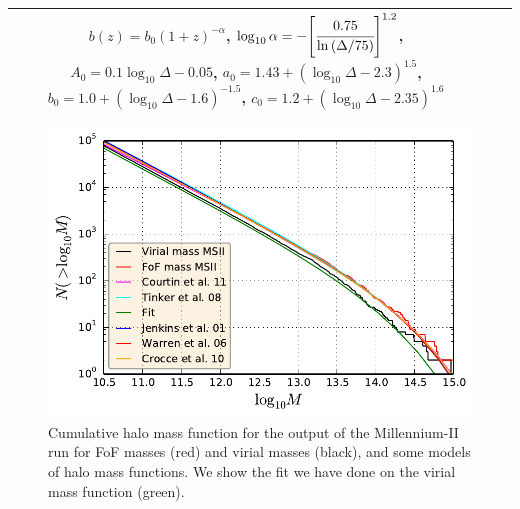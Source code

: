 \begin{table}
\begin{tabular}{cp{6.5cm}p{5cm}}
        $b\left(z\right)=b_0{\left(1+z\right)}^{-\alpha}$,\newline
        $\log_{10}\alpha=
        -{\left[\cfrac{0.75}{\ln\left(\Delta/75\right)}\right]}^{1.2}$,\newline
        $A_0=0.1\log_{10}\Delta-0.05$,\newline
        $a_0=1.43+{\left(\log_{10}\Delta-2.3\right)}^{1.5}$,\newline
        $b_0=1.0+{\left(\log_{10}\Delta-1.6\right)}^{-1.5}$,\newline
        $c_0=1.2+{\left(\log_{10}\Delta-2.35\right)}^{1.6}$ \\
        \bottomrule
    \end{tabular}
\end{table}

\begin{figure}[t]
    \centering
    \includegraphics[width=0.6\linewidth]{figures/hmf/hmf.pdf}
    \caption{Cumulative halo mass function for the output of the Millennium-II
    run for FoF masses (red) and virial masses (black), and some models of halo
mass functions. We show the fit we have done on the virial mass function
(green).\label{fig:hmf}}
\end{figure}
